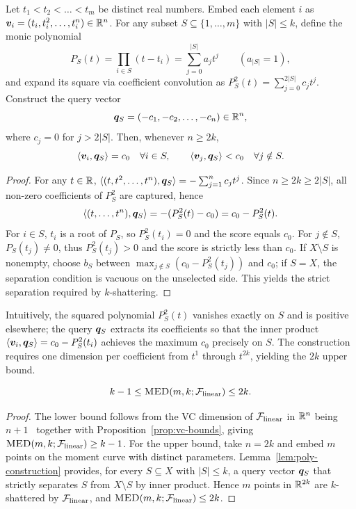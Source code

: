 \documentclass{article}
\begin{document}
\begin{lemma}\label{lem:poly-construction}
Let $t_1 < t_2 < \dots < t_m$ be distinct real numbers. Embed each element $i$ as $\bm{v}_i = (t_i, t_i^2, \dots, t_i^n) \in \mathbb{R}^n$. For any subset $S \subseteq \{1,\dots,m\}$ with $|S| \le k$, define the monic polynomial
\[
P_S(t) = \prod_{i \in S} (t - t_i) = \sum_{j=0}^{|S|} a_j t^j \qquad (a_{|S|} = 1),
\]
and expand its square via coefficient convolution as $P_S^2(t) = \sum_{j=0}^{2|S|} c_j t^j$. Construct the query vector
\[
\bm{q}_S = (-c_1, -c_2, \dots, -c_n) \in \mathbb{R}^n,
\]
where $c_j = 0$ for $j > 2|S|$. Then, whenever $n \ge 2k$,
\[
\langle \bm{v}_i, \bm{q}_S \rangle = c_0 \quad \forall i \in S,
\qquad
\langle \bm{v}_j, \bm{q}_S \rangle < c_0 \quad \forall j \notin S.
\]
\end{lemma}
\begin{proof}
For any $t \in \mathbb{R}$, $\langle (t, t^2, \dots, t^n), \bm{q}_S \rangle = -\sum_{j=1}^{n} c_j t^j$. Since $n \ge 2k \ge 2|S|$, all non-zero coefficients of $P_S^2$ are captured, hence
\[
\langle (t, \dots, t^n), \bm{q}_S \rangle = -(P_S^2(t) - c_0) = c_0 - P_S^2(t).
\]
For $i \in S$, $t_i$ is a root of $P_S$, so $P_S^2(t_i) = 0$ and the score equals $c_0$. For $j \notin S$, $P_S(t_j) \neq 0$, thus $P_S^2(t_j) > 0$ and the score is strictly less than $c_0$. If $X\setminus S$ is nonempty, choose $b_S$ between $\max_{j \notin S} (c_0 - P_S^2(t_j))$ and $c_0$; if $S=X$, the separation condition is vacuous on the unselected side. This yields the strict separation required by $k$-shattering.
\end{proof}

Intuitively, the squared polynomial $P_S^2(t)$ vanishes exactly on $S$ and is positive elsewhere; the query $\bm{q}_S$ extracts its coefficients so that the inner product $\langle \bm{v}_i, \bm{q}_S \rangle = c_0 - P_S^2(t_i)$ achieves the maximum $c_0$ precisely on $S$. The construction requires one dimension per coefficient from $t^1$ through $t^{2k}$, yielding the $2k$ upper bound.

\begin{theorem}\label{thm:linear-lower-upper}
    $$k-1\leq \textsc{MED}(m, k; \mathcal{F}_{\rm linear}) \leq 2k.$$
\end{theorem}
\begin{proof}
The lower bound follows from the VC dimension of $\mathcal{F}_{\rm linear}$ in $\mathbb{R}^n$ being $n+1$~\citep{mohri2018foundations} together with Proposition~\ref{prop:vc-bounds}, giving $\textsc{MED}(m,k;\mathcal{F}_{\rm linear}) \ge k-1$. For the upper bound, take $n = 2k$ and embed $m$ points on the moment curve with distinct parameters. Lemma~\ref{lem:poly-construction} provides, for every $S\subseteq X$ with $|S|\le k$, a query vector $\bm{q}_S$ that strictly separates $S$ from $X\setminus S$ by inner product. Hence $m$ points in $\mathbb{R}^{2k}$ are $k$-shattered by $\mathcal{F}_{\rm linear}$, and $\textsc{MED}(m,k;\mathcal{F}_{\rm linear}) \le 2k$.
\end{proof}
\end{document}
